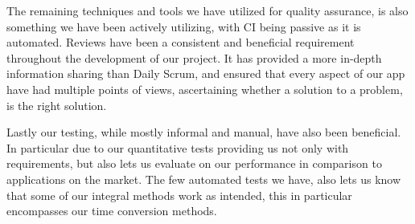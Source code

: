 The remaining techniques and tools we have utilized for quality assurance, is also something we have been actively utilizing, with \ac{CI} being passive as it is automated.
Reviews have been a consistent and beneficial requirement throughout the development of our project.
It has provided a more in-depth information sharing than Daily Scrum, and ensured that every aspect of our app have had multiple points of views, ascertaining whether a solution to a problem, is the right solution.

Lastly our testing, while mostly informal and manual, have also been beneficial.
In particular due to our quantitative tests providing us not only with requirements, but also lets us evaluate on our performance in comparison to applications on the market.
The few automated tests we have, also lets us know that some of our integral methods work as intended, this in particular encompasses our time conversion methods.




